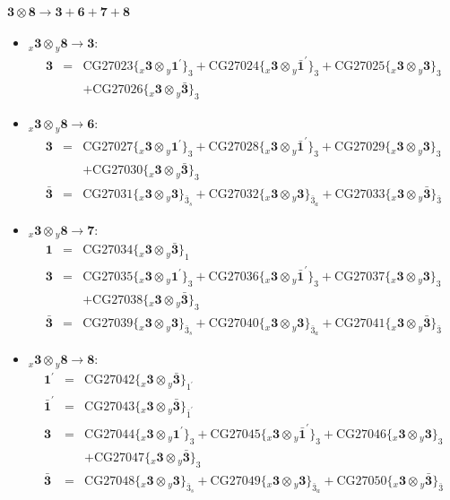 \documentclass[english]{article}
\newcommand{\rep}[1]{\mathbf{#1}}
\newcommand{\repx}[2]{{}_{#2}\mathbf{#1}}
\newcommand{\subcg}[3]{\big\{ \repx{#1}{x}\otimes\repx{#2}{y}\big\}^{}_{#3}}
\begin{document}
\paragraph*{\Large $\rep{3}\otimes\rep{8}\to\rep{3}+\rep{6}+\rep{7}+\rep{8}$}
\begin{itemize}
\item $\repx{3}{x}\otimes\repx{8}{y}\to\rep{3}$:
\begin{eqnarray*}
\rep{3} &=& \text{CG27023}\subcg{3}{1^{\prime}}{3}+\text{CG27024}\subcg{3}{\bar{1}^{\prime}}{3}+\text{CG27025}\subcg{3}{3}{3} \\ 
 & & +\text{CG27026}\subcg{3}{\bar{3}}{3}
\end{eqnarray*}
\item $\repx{3}{x}\otimes\repx{8}{y}\to\rep{6}$:
\begin{eqnarray*}
\rep{3} &=& \text{CG27027}\subcg{3}{1^{\prime}}{3}+\text{CG27028}\subcg{3}{\bar{1}^{\prime}}{3}+\text{CG27029}\subcg{3}{3}{3} \\ 
 & & +\text{CG27030}\subcg{3}{\bar{3}}{3}
\\
\rep{\bar{3}} &=& \text{CG27031}\subcg{3}{3}{\bar{3}_{s}}+\text{CG27032}\subcg{3}{3}{\bar{3}_{a}}+\text{CG27033}\subcg{3}{\bar{3}}{\bar{3}}
\end{eqnarray*}
\item $\repx{3}{x}\otimes\repx{8}{y}\to\rep{7}$:
\begin{eqnarray*}
\rep{1} &=& \text{CG27034}\subcg{3}{\bar{3}}{1}
\\
\rep{3} &=& \text{CG27035}\subcg{3}{1^{\prime}}{3}+\text{CG27036}\subcg{3}{\bar{1}^{\prime}}{3}+\text{CG27037}\subcg{3}{3}{3} \\ 
 & & +\text{CG27038}\subcg{3}{\bar{3}}{3}
\\
\rep{\bar{3}} &=& \text{CG27039}\subcg{3}{3}{\bar{3}_{s}}+\text{CG27040}\subcg{3}{3}{\bar{3}_{a}}+\text{CG27041}\subcg{3}{\bar{3}}{\bar{3}}
\end{eqnarray*}
\item $\repx{3}{x}\otimes\repx{8}{y}\to\rep{8}$:
\begin{eqnarray*}
\rep{1^{\prime}} &=& \text{CG27042}\subcg{3}{\bar{3}}{1^{\prime}}
\\
\rep{\bar{1}^{\prime}} &=& \text{CG27043}\subcg{3}{\bar{3}}{\bar{1}^{\prime}}
\\
\rep{3} &=& \text{CG27044}\subcg{3}{1^{\prime}}{3}+\text{CG27045}\subcg{3}{\bar{1}^{\prime}}{3}+\text{CG27046}\subcg{3}{3}{3} \\ 
 & & +\text{CG27047}\subcg{3}{\bar{3}}{3}
\\
\rep{\bar{3}} &=& \text{CG27048}\subcg{3}{3}{\bar{3}_{s}}+\text{CG27049}\subcg{3}{3}{\bar{3}_{a}}+\text{CG27050}\subcg{3}{\bar{3}}{\bar{3}}
\end{eqnarray*}
\end{itemize}
\end{document}
